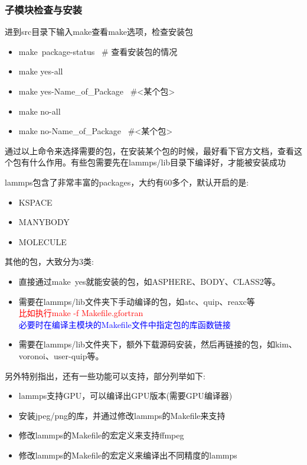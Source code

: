 \documentclass[10pt,a4paper]{article}
\begin{document}
\subsubsection{子模块检查与安装}
进到\textrm{src}目录下输入\textrm{make}查看\textrm{make}选项，检查安装包
\begin{itemize}
	\item \textrm{make~package-status}~ \# 查看安装包的情况
	\item \textrm{make yes-all}
	\item \textrm{make yes-Name\_of\_Package}~ \#<某个包>
	\item \textrm{make no-all}
	\item \textrm{make no-Name\_of\_Package}~ \#<某个包>
\end{itemize}
通过以上命令来选择需要的包，在安装某个包的时候，最好看下官方文档，查看这个包有什么作用。有些包需要先在\textrm{lammps/lib}目录下编译好，才能被安装成功

\textrm{lammps}包含了非常丰富的\textrm{packages}，大约有60多个，默认开启的是:~
\begin{itemize}
	\item \textrm{KSPACE}
	\item \textrm{MANYBODY}
	\item \textrm{MOLECULE}
\end{itemize}

其他的包，大致分为3类:~
\begin{itemize}
	\item 直接通过\textrm{make~yes}就能安装的包，如\textrm{ASPHERE}、\textrm{BODY}、\textrm{CLASS2}等。
	\item 需要在\textrm{lammps/lib}文件夹下手动编译的包，如\textrm{atc}、\textrm{quip}、\textrm{reaxc}等\\
		\textcolor{red}{比如执行\textrm{make -f Makefile.gfortran}}\\
		\textcolor{blue}{必要时在编译主模块的\textrm{Makefile}文件中指定包的库函数链接}
	\item 需要在\textrm{lammps/lib}文件夹下，额外下载源码安装，然后再链接的包，如\textrm{kim}、\textrm{voronoi}、\textrm{user-quip}等。
\end{itemize}

另外特别指出，还有一些功能可以支持，部分列举如下:~
\begin{itemize}
	\item \textrm{lammps}支持\textrm{GPU}，可以编译出\textrm{GPU}版本(需要\textrm{GPU}编译器)
	\item 安装\textrm{jpeg/png}的库，并通过修改\textrm{lammps}的\textrm{Makefile}来支持
	\item 修改\textrm{lammps}的\textrm{Makefile}的宏定义来支持\textrm{ffmpeg}
	\item 修改\textrm{lammps}的\textrm{Makefile}的宏定义来编译出不同精度的\textrm{lammps}
\end{itemize}
\end{document}
